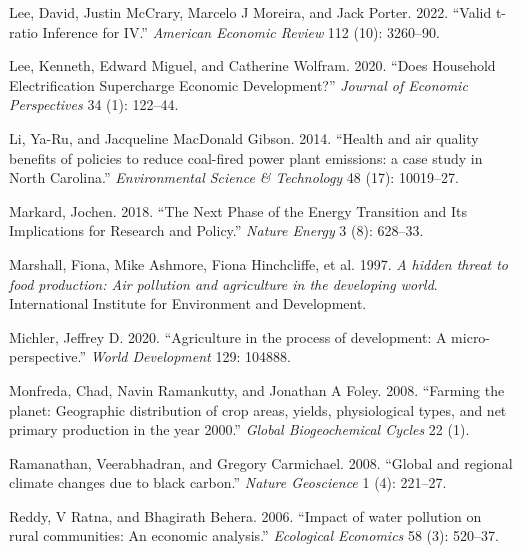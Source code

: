\documentclass[
]{article}
\newlength{\cslhangindent}
\newlength{\cslentryspacingunit} %
\newenvironment{CSLReferences}[2] %
 {%
  \setlength{\parindent}{0pt}
  \ifodd #1
  \let\oldpar\par
  \def\par{\hangindent=\cslhangindent\oldpar}
  \fi
  \setlength{\parskip}{#2\cslentryspacingunit}
 }%
 {}
\begin{document}
\begin{CSLReferences}{1}{0}
\leavevmode{}%
Lee, David, Justin McCrary, Marcelo J Moreira, and Jack Porter. 2022. {``{Valid t-ratio Inference for IV}.''} \emph{{American Economic Review}} 112 (10): 3260--90.

\leavevmode{}%
Lee, Kenneth, Edward Miguel, and Catherine Wolfram. 2020. {``Does Household Electrification Supercharge Economic Development?''} \emph{{Journal of Economic Perspectives}} 34 (1): 122--44.

\leavevmode{}%
Li, Ya-Ru, and Jacqueline MacDonald Gibson. 2014. {``{Health and air quality benefits of policies to reduce coal-fired power plant emissions: a case study in North Carolina}.''} \emph{{Environmental Science \& Technology}} 48 (17): 10019--27.

\leavevmode{}%
Markard, Jochen. 2018. {``The Next Phase of the Energy Transition and Its Implications for Research and Policy.''} \emph{{Nature Energy}} 3 (8): 628--33.

\leavevmode{}%
Marshall, Fiona, Mike Ashmore, Fiona Hinchcliffe, et al. 1997. \emph{{A hidden threat to food production: Air pollution and agriculture in the developing world}}. {International Institute for Environment and Development.}

\leavevmode{}%
Michler, Jeffrey D. 2020. {``{Agriculture in the process of development: A micro-perspective}.''} \emph{{World Development}} 129: 104888.

\leavevmode{}%
Monfreda, Chad, Navin Ramankutty, and Jonathan A Foley. 2008. {``{Farming the planet: Geographic distribution of crop areas, yields, physiological types, and net primary production in the year 2000}.''} \emph{{Global Biogeochemical Cycles}} 22 (1).

\leavevmode{}%
Ramanathan, Veerabhadran, and Gregory Carmichael. 2008. {``{Global and regional climate changes due to black carbon}.''} \emph{{Nature Geoscience}} 1 (4): 221--27.

\leavevmode{}%
Reddy, V Ratna, and Bhagirath Behera. 2006. {``{Impact of water pollution on rural communities: An economic analysis}.''} \emph{{Ecological Economics}} 58 (3): 520--37.


\end{CSLReferences}
\end{document}
